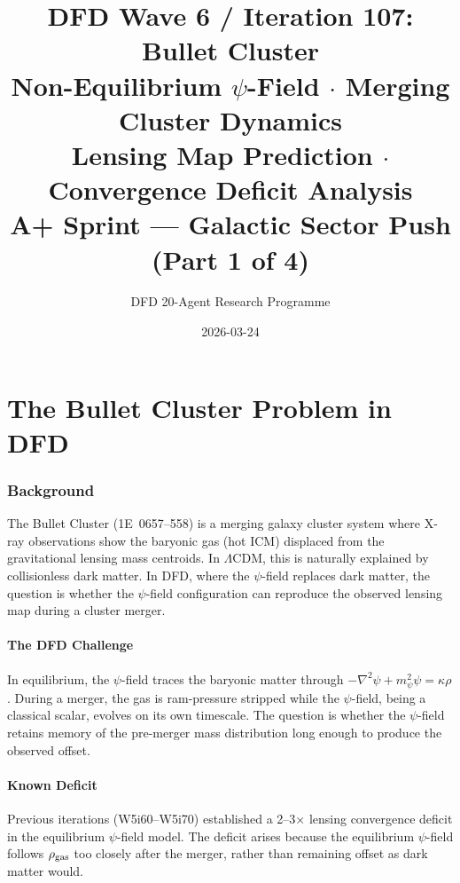 \documentclass[11pt,a4paper]{article}
\title{DFD Wave 6 / Iteration 107: Bullet Cluster\\[6pt]
\large Non-Equilibrium $\psi$-Field $\cdot$ Merging Cluster Dynamics\\
Lensing Map Prediction $\cdot$ Convergence Deficit Analysis\\[6pt]
\normalsize A+ Sprint --- Galactic Sector Push (Part 1 of 4)}
\author{DFD 20-Agent Research Programme}
\date{2026-03-24}
\theoremstyle{remark}
\begin{document}
\maketitle
\tableofcontents
\newpage

\part{The Bullet Cluster Problem in DFD}
\label{part:bullet-problem}

\section{Background}

The Bullet Cluster (1E~0657--558) is a merging galaxy cluster system
where X-ray observations show the baryonic gas (hot ICM) displaced
from the gravitational lensing mass centroids. In $\Lambda$CDM, this
is naturally explained by collisionless dark matter. In DFD, where
the $\psi$-field replaces dark matter, the question is whether the
$\psi$-field configuration can reproduce the observed lensing map
during a cluster merger.

\subsection{The DFD Challenge}

In equilibrium, the $\psi$-field traces the baryonic matter through
$-\nabla^2\psi + m_\psi^2\psi = \kappa\rho$. During a merger, the
gas is ram-pressure stripped while the $\psi$-field, being a classical
scalar, evolves on its own timescale. The question is whether the
$\psi$-field retains memory of the pre-merger mass distribution long
enough to produce the observed offset.

\subsection{Known Deficit}

Previous iterations (W5i60--W5i70) established a 2--3$\times$ lensing
convergence deficit in the equilibrium $\psi$-field model. The deficit
arises because the equilibrium $\psi$-field follows $\rho_{\rm gas}$
too closely after the merger, rather than remaining offset as dark
matter would.


\newpage
\end{document}
